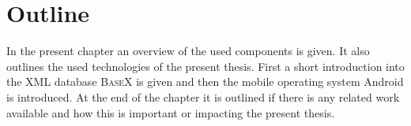 \chapter{Outline}
\label{cha:overview}
In the present chapter an overview of the used components is given.
It also outlines the used technologies of the present thesis.
First a short introduction into the XML database \textsc{BaseX} is given and then the mobile operating system Android is introduced.
At the end of the chapter it is outlined if there is any related work available and how this is important or impacting the present thesis.

%


